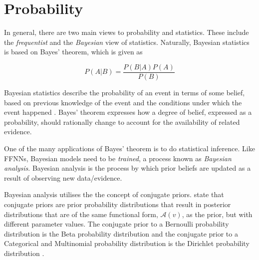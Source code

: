 \section{Probability}
\label{sec:probability}

In general, there are two main views to probability and statistics. These include the \textit{frequentist} and the \textit{Bayesian} view of statistics. Naturally, Bayesian statistics is based on Bayes' theorem, which is given as

\begin{equation}
	\label{eq:bayes}
	P(A \vert B) = \frac{P(B \vert A)P(A)}{P(B)}
\end{equation}

Bayesian statistics describe the probability of an event in terms of some belief, based on previous knowledge of the event and the conditions under which the event happened \cite{ref:hackenberger:2019}. Bayes' theorem expresses how a degree of belief, expressed as a probability, should rationally change to account for the availability of related evidence.

One of the many applications of Bayes' theorem is to do statistical inference. Like \acp{FFNN}, Bayesian models need to be \textit{trained}, a process known as \textit{Bayesian analysis}. Bayesian analysis is the process by which prior beliefs are updated as a result of observing new data/evidence.

Bayesian analysis utilises the the concept of conjugate priors. \citeauthor{ref:wackerly:2014}\cite{ref:wackerly:2014} state that conjugate priors are prior probability distributions that result in posterior distributions that are of the same functional form, $\mathcal{A}(v)$, as the prior, but with different parameter values. The conjugate prior to a Bernoulli probability distribution is the Beta probability distribution and the conjugate prior to a Categorical and Multinomial probability distribution is the Dirichlet probability distribution \cite{ref:wackerly:2014}.
